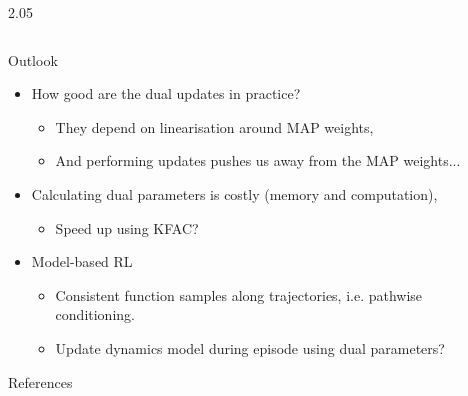 \documentclass[final,12pt]{beamer}
\newlength{\sepwidth}
\newlength{\colwidth}
\newcommand{\separatorcolumn}{\begin{column}{\sepwidth}\end{column}}
\begin{document}
\begin{frame}[t]
\begin{columns}[t]
\begin{column}{2.05\colwidth}
\begin{columns}[t]
\begin{column}{\colwidth}
\begin{block}{Outlook}
   \begin{itemize}
     \item How good are the dual updates in practice?
    \begin{itemize}
        \item They depend on linearisation around MAP weights,
        \item And performing updates pushes us away from the MAP weights...
    \end{itemize}
     \item Calculating dual parameters is costly (memory and computation),
    \begin{itemize}
        \item Speed up using KFAC?
    \end{itemize}
     \item Model-based RL
    \begin{itemize}
        \item Consistent function samples along trajectories, i.e. pathwise conditioning.
        \item Update dynamics model during episode using dual parameters?
    \end{itemize}
   \end{itemize}

  \end{block}

  \vspace*{1em}

  \nocite{*} %

  \begin{block}{References}
    \vspace*{-.25em}
    \footnotesize{}
  \end{block}

\end{column}

\end{columns}

\end{column}

\separatorcolumn

\end{columns}

\end{frame}
\end{document}
